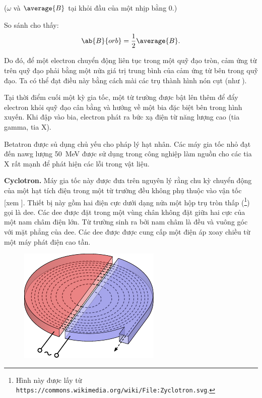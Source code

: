 \noindent
($\omega$ và $\average{B}$ tại khỏi đầu của một nhịp bằng 0.)

So sánh  cho thấy:
\begin{equation*}
    \ab{B}{orb} = \frac{1}{2} \average{B}.
\end{equation*}

\noindent
Do đó, để một electron chuyển động liên tục trong một quỹ đạo tròn, cảm ứng từ trên quỹ đạo phải bằng một nửa giá trị trung bình của cảm ứng từ bên trong quỹ đạo.
Ta có thể đạt điều này bằng cách mài các trụ thành hình nón cụt  (như ).

Tại thời điểm cuối một kỳ gia tốc, một từ trường được bật lên thêm để đẩy electron khỏi quỹ đạo cân bằng và hướng về một bia đặc biệt bên trong hình xuyến.
Khi đập vào bia, electron phát ra bức xạ điện từ năng lượng cao (tia gamma, tia X).

Betatron được sủ dụng chủ yếu cho pháp lý hạt nhân. Các máy gia tốc nhỏ đạt đến nawg lượng \SI{50}{\mega\electronvolt} được sử dụng trong công nghiệp làm nguồn cho các tia X rất mạnh để phát hiện các lỗi trong vật liệu.

\textbf{Cyclotron.} Máy gia tốc này được đưa trên nguyên lý rằng chu kỳ chuyển động của một hạt tích điện trong một từ trường đều không phụ thuộc vào vận tốc [xem  ].
Thiết bị này gồm hai điện cực dưới dạng nửa một hộp trụ tròn thấp (\footnote{Hình này được lấy từ \texttt{https://commons.wikimedia.org/wiki/File:Zyclotron.svg}.}) gọi là dee.
Các dee được đặt trong một vùng chân không đặt giữa hai cực của một nam châm điện lớn.
Từ trường sinh ra bởi nam châm là đều và vuông góc với mặt phẳng của dee.
Các dee được được cung cấp một điện áp xoay chiều từ một máy phát điện cao tần.

\begin{figure}[t]
	\begin{center}
		\includegraphics[scale=1]{figures/ch_10/fig_10_16.pdf}
		\caption[]{}
		\label{fig:10_16}
	\end{center}
	\vspace{-0.8cm}
\end{figure}

